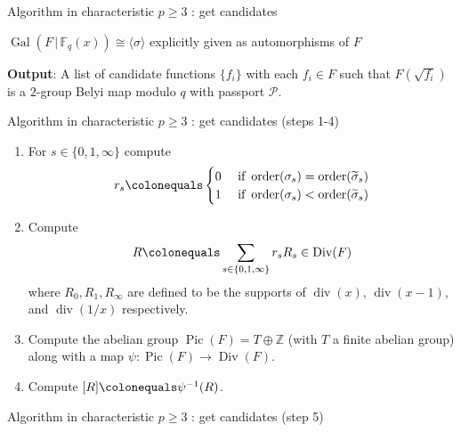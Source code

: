 \documentclass[xcolor=dvipsnames]{beamer}
\theoremstyle{plain}
\newcommand{\ZZ}{\mathbb Z}
\newcommand{\wt}[1]{\widetilde{#1}}
\newcommand{\FF}{\mathbb{F}}
\DeclareMathOperator{\Div}{Div}
\DeclareMathOperator{\Pic}{Pic}
\DeclareMathOperator{\ddiv}{div}
\DeclareMathOperator{\order}{order}
\DeclareMathOperator{\Gal}{Gal}
\begin{document}
{\begin{frame}{Algorithm in characteristic $p\geq 3$ : get candidates}
\begin{itemize}
          $\Gal(F\,|\,\FF_q(x))\cong
          \langle\sigma\rangle$
          explicitly given
          as automorphisms of $F$
      \end{itemize}
      \textbf{Output}:
      A list of candidate functions
      $\{f_i\}$ with each $f_i\in F$
      such that $F(\sqrt{f_i})$ is a
      $2$-group Belyi map modulo $q$
      with passport $\mathcal{P}$.
    \end{frame}
    \begin{frame}{Algorithm in characteristic $p\geq 3$ : get candidates (steps 1-4)}
      \begin{enumerate}
        \item[1.]
          For $s\in\{0,1,\infty\}$
          compute
          \begin{align*}
            r_s\colonequals
            \begin{cases}
              0&
              \text{ if }
              \order(\sigma_s)=
              \order(\wt{\sigma}_s)\\
              1&
              \text{ if }
              \order(\sigma_s)<
              \order(\wt{\sigma}_s)\\
            \end{cases}
          \end{align*}
          \pause
        \item[2.]
          Compute
          \begin{equation*}
            R\colonequals
            \sum_{s\in\{0,1,\infty\}}r_sR_s
            \in\Div(F)
          \end{equation*}
          where
          $R_0,R_1,R_\infty$
          are defined to be the supports
          of
          $\ddiv(x)$,
          $\ddiv(x-1)$,
          and $\ddiv(1/x)$
          respectively.
          \pause
        \item[3.]
          Compute the abelian group
          $\Pic(F)=T\oplus\ZZ$
          (with $T$ a finite abelian group)
          along with a map
          $\psi\colon\Pic(F)\to\Div(F)$.
          \pause
        \item[4.]
          Compute
          $[R]\colonequals\psi^{-1}(R)$.
      \end{enumerate}
    \end{frame}
    \begin{frame}{Algorithm in characteristic $p\geq 3$ : get candidates (step 5)}
      \begin{enumerate}

\end{enumerate}
\end{frame}}
\end{document}
